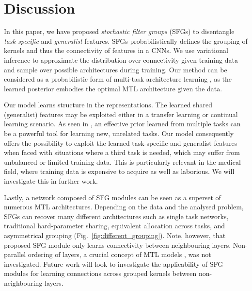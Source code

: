 \section{Discussion}

In this paper, we have proposed \emph{stochastic filter groups} (SFGs) to disentangle \emph{task-specific} and \emph{generalist} features. SFGs probabilistically defines the grouping of kernels and thus the connectivity of features in a CNNs. We use variational inference to approximate the distribution over connectivity given training data and sample over possible architectures during training. Our method can be considered as a probabilistic form of multi-task architecture learning \cite{liang2018evolutionary}, as the learned posterior embodies the optimal MTL architecture given the data.

Our model learns structure in the representations. The learned shared (generalist) features may be exploited either in a transfer learning or continual learning scenario. As seen in \cite{lacost2018}, an effective prior learned from multiple tasks can be a powerful tool for learning new, unrelated tasks. Our model consequently offers the possibility to exploit the learned task-specific and generalist features when faced with situations where a third task is needed, which may suffer from unbalanced or limited training data. This is particularly relevant in the medical field, where training data is expensive to acquire as well as laborious. We will investigate this in further work.

Lastly, a network composed of SFG modules can be seen as a superset of numerous MTL architectures. Depending on the data and the analysed problem, SFGs can recover many different architectures such as single task networks, traditional hard-parameter sharing, equivalent allocation across tasks, and asymmetrical grouping (Fig.~\ref{fig:different_grouping}). Note, however, that proposed SFG module only learns connectivity between neighbouring layers. Non-parallel ordering of layers, a crucial concept of MTL models \cite{meyerson2018beyond, Ruder2019SluiceNL}, was not investigated. Future work will look to investigate the applicability of SFG modules for learning connections across grouped kernels between non-neighbouring layers.



